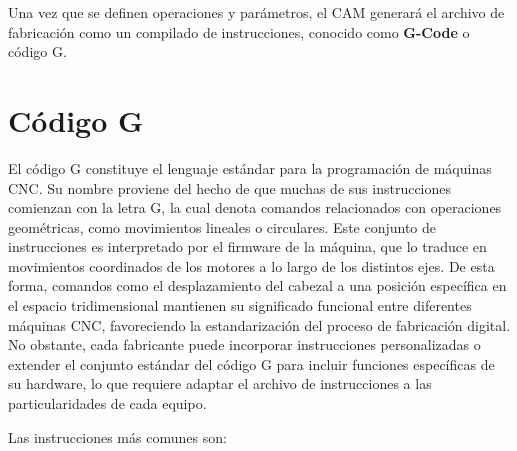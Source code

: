 Una vez que se definen operaciones y parámetros, el CAM generará el archivo de fabricación como un compilado de instrucciones, conocido como \textbf{G-Code} o código G.

\section{Código G}

El código G constituye el lenguaje estándar para la programación de máquinas CNC. Su nombre proviene del hecho de que muchas de sus instrucciones comienzan con la letra G, la cual denota comandos relacionados con operaciones geométricas, como movimientos lineales o circulares. Este conjunto de instrucciones es interpretado por el firmware de la máquina, que lo traduce en movimientos coordinados de los motores a lo largo de los distintos ejes. De esta forma, comandos como el desplazamiento del cabezal a una posición específica en el espacio tridimensional mantienen su significado funcional entre diferentes máquinas CNC, favoreciendo la estandarización del proceso de fabricación digital. No obstante, cada fabricante puede incorporar instrucciones personalizadas o extender el conjunto estándar del código G para incluir funciones específicas de su hardware, lo que requiere adaptar el archivo de instrucciones a las particularidades de cada equipo.

Las instrucciones más comunes son:

